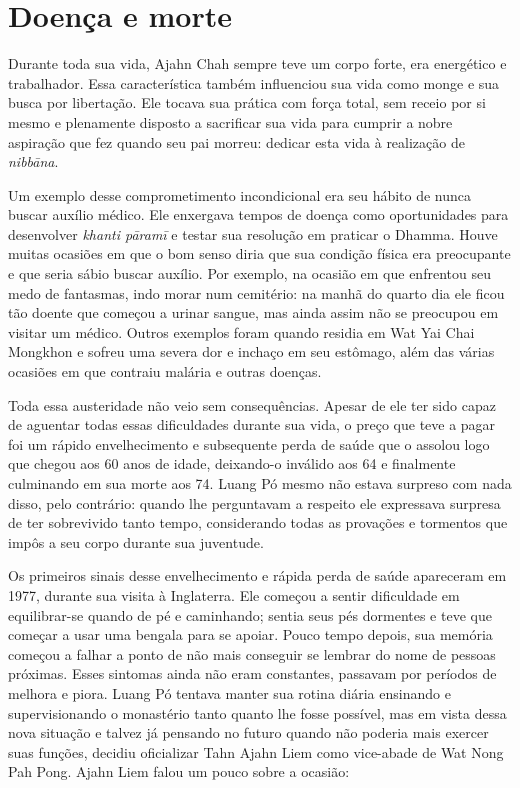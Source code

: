 \chapter{Doença e morte}

Durante toda sua vida, Ajahn Chah sempre teve um corpo forte, era
energético e trabalhador. Essa característica também influenciou sua
vida como monge e sua busca por libertação. Ele tocava sua prática com
força total, sem receio por si mesmo e plenamente disposto a sacrificar
sua vida para cumprir a nobre aspiração que fez quando seu pai morreu:
dedicar esta vida à realização de \emph{nibbāna}.

Um exemplo desse comprometimento incondicional era seu hábito de nunca
buscar auxílio médico. Ele enxergava tempos de doença como oportunidades
para desenvolver \emph{khanti pāramī} e testar sua resolução em praticar
o Dhamma. Houve muitas ocasiões em que o bom senso diria que sua
condição física era preocupante e que seria sábio buscar auxílio. Por
exemplo, na ocasião em que enfrentou seu medo de fantasmas, indo morar
num cemitério: na manhã do quarto dia ele ficou tão doente que começou a
urinar sangue, mas ainda assim não se preocupou em visitar um médico.
Outros exemplos foram quando residia em Wat Yai Chai Mongkhon e sofreu
uma severa dor e inchaço em seu estômago, além das várias ocasiões em que
contraiu malária e outras doenças.

Toda essa austeridade não veio sem consequências. Apesar de ele ter sido
capaz de aguentar todas essas dificuldades durante sua vida, o preço que
teve a pagar foi um rápido envelhecimento e subsequente perda de saúde
que o assolou logo que chegou aos 60 anos de idade, deixando-o inválido
aos 64 e finalmente culminando em sua morte aos 74. Luang Pó mesmo não
estava surpreso com nada disso, pelo contrário: quando lhe perguntavam a
respeito ele expressava surpresa de ter sobrevivido tanto tempo,
considerando todas as provações e tormentos que impôs a seu corpo
durante sua juventude.

Os primeiros sinais desse envelhecimento e rápida perda de saúde
apareceram em 1977, durante sua visita à Inglaterra. Ele começou a
sentir dificuldade em equilibrar-se quando de pé e caminhando; sentia
seus pés dormentes e teve que começar a usar uma bengala para se apoiar.
Pouco tempo depois, sua memória começou a falhar a ponto de não mais
conseguir se lembrar do nome de pessoas próximas. Esses sintomas ainda
não eram constantes, passavam por períodos de melhora e piora. Luang Pó
tentava manter sua rotina diária ensinando e supervisionando o
monastério tanto quanto lhe fosse possível,
mas em vista dessa nova situação e talvez já pensando no futuro quando
não poderia mais exercer suas funções, decidiu oficializar Tahn Ajahn
Liem como vice-abade de Wat Nong Pah Pong. Ajahn Liem falou um pouco
sobre a ocasião:

